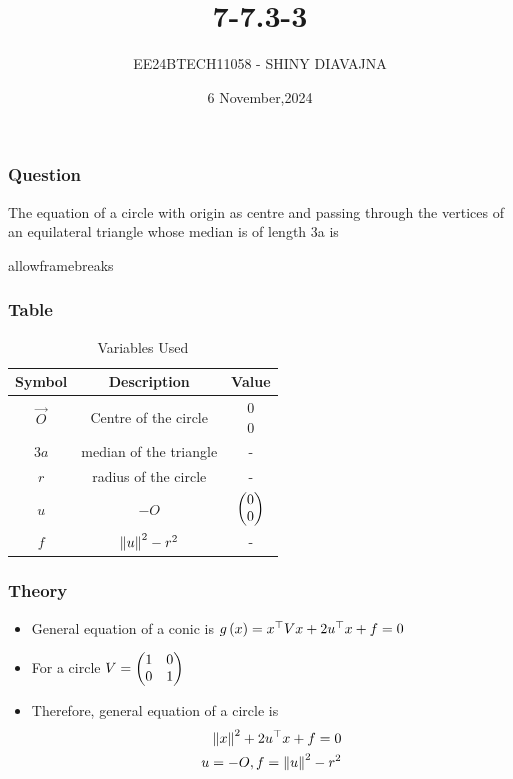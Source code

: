 \documentclass{beamer}
\begin{document}
\title{7-7.3-3}
\author{EE24BTECH11058 - SHINY DIAVAJNA}
\date{6 November,2024}
\frame{\titlepage}

\begin{frame}
\frametitle{Question}
 The equation of a circle with origin as centre and passing through the vertices of an equilateral triangle whose median is of length 3a is \\
\end{frame}
\begin{frame}{allowframebreaks}
\frametitle{Table}
\begin{table}[h!!]
    \centering
    \begin{tabular}[12pt]{ |c|c|c|}
    \hline
	\textbf{Symbol} & \textbf{Description} & \textbf{Value}\\
    \hline
	$\vec{O}$ & Centre of the circle &\myvec{0 \\ 0} \\
    \hline 
	$3a$ & median of the triangle & -  \\
    \hline
	$r$  & radius of the circle & - \\
    \hline
	$u$  & $-O$ & $\begin{pmatrix}0 \\ 0\end{pmatrix}$\\
    \hline
        $f$ & ${\left\lVert u\right\rVert}^2 - {r}^2 $ & - \\
    \hline
    \end{tabular}
    \caption{Variables Used}
    \label{tab 7.7.3.3}
\end{table}
\end{frame}

\begin{frame}
\frametitle{Theory}
  \begin{itemize}
      \item General equation of a conic is $g\left(x\right) = x^\top V x + 2 u^\top x+f =0$
      
      \item For a circle $V = \begin{pmatrix}1 & 0 \\ 0 & 1\end{pmatrix}$
      
      \item Therefore, general equation of a circle is \\
           \begin{align}
               {\left\lVert x\right\rVert}^2 + 2 u^\top x+f =0 \\
               u = -O  ,  f = {\left\lVert u\right\rVert}^2 - {r}^2 
           \end{align}\\
           
   \end{itemize}
\end{frame}
\end{document}

